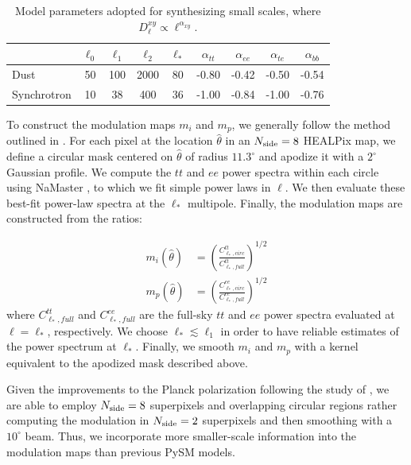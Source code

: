 \documentclass[twocolumn]{aastex631}
\begin{document}
\begin{table}
    \centering
    \footnotesize
    \begin{tabular}{lcccccccc}
    \toprule 
   & $\ell_0$ &   $ \ell_1  $&$\ell_2$   &$\ell_* $& $\alpha_{tt}$  & $\alpha_{ee}$ &$\alpha_{te}$ &$\alpha_{bb}$ \\
   \midrule  
   Dust & 50 & 100 & 2000 & 80 & -0.80 & -0.42& -0.50 & -0.54 \\ 
   Synchrotron & 10 & 38 & 400 & 36 & -1.00& -0.84 & -1.00 & -0.76 \\
   \bottomrule
    \end{tabular}
    \caption{Model parameters adopted for synthesizing small scales, where $D_{\ell}^{xy} \propto \ell^{\alpha_{xy}}$.}
    \label{tab:smallscale_par}
\end{table}

To construct the modulation maps $m_i$ and $m_p$, we generally follow the method outlined in \citet{Thorne:2017}. For each pixel at the location $\hat{\theta}$ in an $N_{\rm side} = 8$ HEALPix map, we define a circular mask centered on $\hat{\theta}$ of radius $11.3^\circ$  and apodize it with a $2^\circ$ Gaussian profile. We compute the $tt$ and $ee$ power spectra within each circle using NaMaster \citep{Alonso:2019}, to which we fit simple power laws in $\ell$. We then evaluate these best-fit power-law spectra at the $\ell_*$ multipole. Finally, the modulation maps are constructed from the ratios:

\begin{align}
\label{eq:mod_maps}
    m_i\left(\hat{\theta}\right) &= \left(\frac{C^{tt}_{\ell_*,circ}}{C^{tt}_{\ell_*,full}}\right)^{1/2} \\
    m_p\left(\hat{\theta}\right) &= \left(\frac{C^{ee}_{\ell_*,circ}}{C^{ee}_{\ell_*,full}}\right)^{1/2}
\end{align}
where $C^{tt}_{\ell_*,full}$ and $C^{ee}_{\ell_*,full}$ are the full-sky $tt$ and $ee$ power spectra evaluated at $\ell = \ell_*$, respectively. We choose $\ell_* \lesssim \ell_1$ in order to have reliable estimates of the power spectrum at $\ell_*$. Finally, we smooth $m_i$ and $m_p$ with a kernel equivalent to the apodized mask described above. %

Given the improvements to the Planck polarization following the study of \citet{Thorne:2017} \citep[see discussion in][]{planck2016-l01}, we are able to employ $N_{\rm side} = 8$ superpixels and overlapping circular regions rather computing the modulation in $N_{\rm side} = 2$ superpixels and then smoothing with a $10^\circ$ beam. Thus, we incorporate more smaller-scale information into the modulation maps than previous PySM models. 
\end{document}
